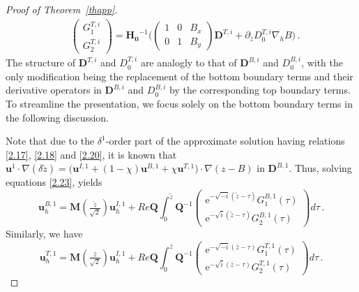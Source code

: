 \documentclass[pdflatex,sn-mathphys-num]{sn-jnl}%
\theoremstyle{thmstyleone}%
\theoremstyle{thmstyletwo}%
\theoremstyle{thmstylethree}%
\theoremstyle{thmstyletwo}
\begin{document}
\begin{proof}[Proof of Theorem~{\upshape\ref{thapp}}]
\begin{align*}
	&\begin{pmatrix}
		G^{T,i}_1\\
		G^{T,i}_2
	\end{pmatrix}=\boldsymbol{H_0}^{-1}
	\bigg(\begin{pmatrix}
		1&0&B_x\\
		0&1&B_y	
	\end{pmatrix}\boldsymbol{D}^{T,i}+\partial_{\bar{z}} D^{T,i}_0\nabla_h B\bigg)\,.
\end{align*}
The structure of $\boldsymbol{D}^{T,i}$ and ${D}_0^{T,i}$
are analogly to that of  $\boldsymbol{D}^{B,i}$ and ${D}_0^{B,i}$,
with the only modification being the replacement of the bottom boundary terms and their derivative operators in 
$\boldsymbol{D}^{B,i}$ and ${D}_0^{B,i}$ by the corresponding top boundary terms.
To streamline the presentation, we focus solely on the bottom boundary terms in the following discussion.



Note that due to the $\delta^{1}$-order part of the approximate solution having relations \eqref{2.17}, \eqref{2.18} and \eqref{2.20}, it is known that $\boldsymbol{u}^{1}\cdot\nabla(\delta\tilde{z})=\big(\boldsymbol{u}^{I,1}+(1-\chi)\boldsymbol{u}^{B,1}+\chi\boldsymbol{u}^{T,1}\big)\cdot\nabla(z-B)$ in $\boldsymbol{D}^{B,1}$.
Thus, solving equations \eqref{2.23},  yields
\begin{equation}\label{2.24}
	\boldsymbol u_h^{B,1}=
	\boldsymbol{M}(\tfrac{\tilde z}{\sqrt 2})
	\boldsymbol u_h^{I,1}
	+
	Re\boldsymbol{Q}
	\int_0^{\tilde{z}}
	\boldsymbol{Q}^{-1}\begin{pmatrix}
		{\mathrm{e}}^{-\sqrt{-i}(\tilde{z}-\tau)} G^{B,1}_1(\tau)
		\\
		{\mathrm{e}}^{-\sqrt{i}(\tilde{z}-\tau)} G^{B,1}_2(\tau) 
	\end{pmatrix}{d}\tau\,.
\end{equation}
Similarly, we have
\begin{equation}\label{2.25}
	\boldsymbol u_h^{T,1}=
	\boldsymbol{M}(\tfrac{\bar z}{\sqrt 2})
	\boldsymbol u_h^{I,1}
	+
	Re\boldsymbol{Q}
	\int_0^{\bar{z}}
	\boldsymbol{Q}^{-1}\begin{pmatrix}
		{\mathrm{e}}^{-\sqrt{-i}(\bar{z}-\tau)} G^{T,1}_1(\tau)
		\\
		{\mathrm{e}}^{-\sqrt{i}(\bar{z}-\tau)} G^{T,1}_2(\tau) 
	\end{pmatrix}{d}\tau\,.
\end{equation}





\end{proof}
\end{document}
